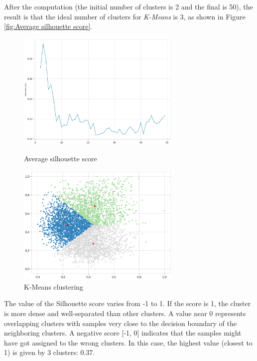 \documentclass[a4paper,11pt,dvipsnames]{article}
\begin{document}
After the computation (the initial number of clusters is 2 and the final is 50), the result is that the ideal number of clusters for \textit{K-Means} is 3, as shown in Figure \ref{fig:Average silhouette score}.

\begin{figure}[h]
    \centering

\begin{minipage}{0.49\textwidth}
    \centering
    \includegraphics[width=0.7\textwidth]{Graphs/Average silhouette score.png}
    \caption{Average silhouette score}
    \label{fig:Average silhouette score}
\end{minipage}
\hfil
\begin{minipage}{0.5\textwidth}
\centering
    \includegraphics[width=0.7\textwidth]{Graphs/K-Means.png}
    \caption{K-Means clustering}
    \label{fig:K-Means}
\end{minipage}
\end{figure}

The value of the Silhouette score varies from -1 to 1. If the score is 1, the cluster is more dense and well-separated than other clusters. A value near 0 represents overlapping clusters with samples very close to the decision boundary of the neighboring clusters. A negative score [-1, 0] indicates that the samples might have got assigned to the wrong clusters. In this case, the highest value (closest to 1) is given by 3 clusters: 0.37.
\end{document}
